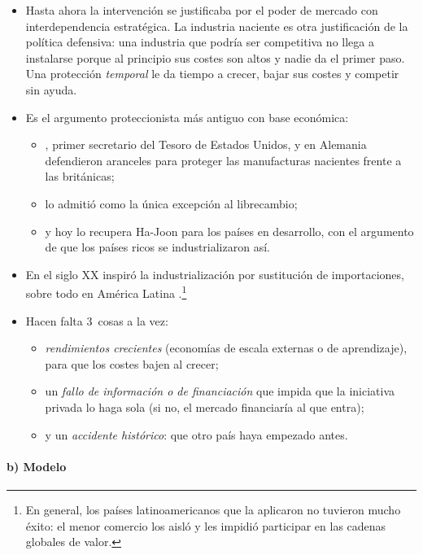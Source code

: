 \documentclass[11pt]{article}
\begin{document}
\begin{itemize}
\item Hasta ahora la intervención se justificaba por el poder de mercado con interdependencia estratégica. La industria naciente es otra justificación de la política defensiva: una industria que podría ser competitiva no llega a instalarse porque al principio sus costes son altos y nadie da el primer paso. Una protección \emph{temporal} le da tiempo a crecer, bajar sus costes y competir sin ayuda.
\item Es el argumento proteccionista más antiguo con base económica:
  \begin{itemize}
  \item \textcite{Hamilton1791Report}, primer secretario del Tesoro de Estados Unidos, y \textcite{List1841System} en Alemania defendieron aranceles para proteger las manufacturas nacientes frente a las británicas;
  \item \textcite[libro~V, cap.~X]{Mill1909Principles} lo admitió como la única excepción al librecambio;
  \item y hoy lo recupera Ha-Joon \textcite{Chang2002} para los países en desarrollo, con el argumento de que los países ricos se industrializaron así.
  \end{itemize}
\item En el siglo XX inspiró la industrialización por sustitución de importaciones, sobre todo en América Latina .\footnote{En general, los países latinoamericanos que la aplicaron no tuvieron mucho éxito: el menor comercio los aisló y les impidió participar en las cadenas globales de valor.}
\item Hacen falta 3~cosas a la vez:
  \begin{itemize}
  \item \emph{rendimientos crecientes} (economías de escala externas o de aprendizaje), para que los costes bajen al crecer;
  \item un \emph{fallo de información o de financiación} que impida que la iniciativa privada lo haga sola (si no, el mercado financiaría al que entra);
  \item y un \emph{accidente histórico}: que otro país haya empezado antes.
  \end{itemize}
\end{itemize}

\paragraph{b) Modelo}
\end{document}
